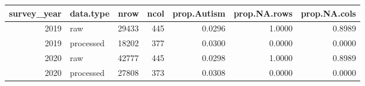 \begin{tabular}{rlrrrrr}
  \hline
survey\_year & data.type & nrow & ncol & prop.Autism & prop.NA.rows & prop.NA.cols \\ 
  \hline
 2019 & raw & 29433 &   445 & 0.0296 & 1.0000 & 0.8989 \\ 
   2019 & processed & 18202 &   377 & 0.0300 & 0.0000 & 0.0000 \\ 
   2020 & raw & 42777 &   445 & 0.0298 & 1.0000 & 0.8989 \\ 
   2020 & processed & 27808 &   373 & 0.0308 & 0.0000 & 0.0000 \\ 
   \hline
\end{tabular}
